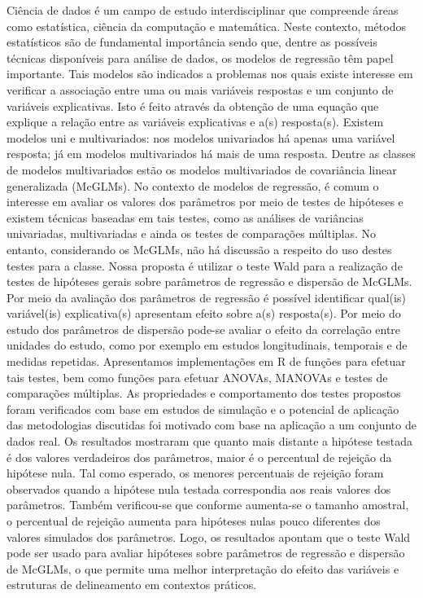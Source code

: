 \begin{resumo}

Ciência de dados é um campo de estudo interdisciplinar que compreende áreas como estatística, ciência da computação e matemática. Neste contexto, métodos estatísticos são de fundamental importância sendo que, dentre as possíveis técnicas disponíveis para análise de dados, os modelos de regressão têm papel importante. Tais modelos são indicados a problemas nos quais existe interesse em verificar a associação entre uma ou mais variáveis respostas e um conjunto de variáveis explicativas. Isto é feito através da obtenção de uma equação que explique a relação entre as variáveis explicativas e a(s) resposta(s). Existem modelos uni e multivariados: nos modelos univariados há apenas uma variável resposta; já em modelos multivariados há mais de uma resposta. Dentre as classes de modelos multivariados estão os modelos multivariados de covariância linear generalizada (McGLMs). No contexto de modelos de regressão, é comum o interesse em avaliar os valores dos parâmetros por meio de testes de hipóteses e existem técnicas baseadas em tais testes, como as análises de variâncias univariadas, multivariadas e ainda os testes de comparações múltiplas. No entanto, considerando os McGLMs, não há discussão a respeito do uso destes testes para a classe. Nossa proposta é utilizar o teste Wald para a realização de testes de hipóteses gerais sobre parâmetros de regressão e dispersão de McGLMs. Por meio da avaliação dos parâmetros de regressão é possível identificar qual(is) variável(is) explicativa(s) apresentam efeito sobre a(s) resposta(s). Por meio do estudo dos parâmetros de dispersão pode-se avaliar o efeito da correlação entre unidades do estudo, como por exemplo em estudos longitudinais, temporais e de medidas repetidas. Apresentamos implementações em R de funções para efetuar tais testes, bem como funções para efetuar ANOVAs, MANOVAs e testes de comparações múltiplas. As propriedades e comportamento dos testes propostos foram verificados com base em estudos de simulação e o potencial de aplicação das metodologias discutidas foi motivado com base na aplicação a um conjunto de dados real. Os resultados mostraram que quanto mais distante a hipótese testada é dos valores verdadeiros dos parâmetros, maior é o percentual de rejeição da hipótese nula. Tal como esperado, os menores percentuais de rejeição foram observados quando a hipótese nula testada correspondia aos reais valores dos parâmetros. Também verificou-se que conforme aumenta-se o tamanho amostral, o percentual de rejeição aumenta para hipóteses nulas pouco diferentes dos valores simulados dos parâmetros. Logo, os resultados apontam que o teste Wald pode ser usado para avaliar hipóteses sobre parâmetros de regressão e dispersão de McGLMs, o que permite uma melhor interpretação do efeito das variáveis e estruturas de delineamento em contextos práticos.

\end{resumo}
